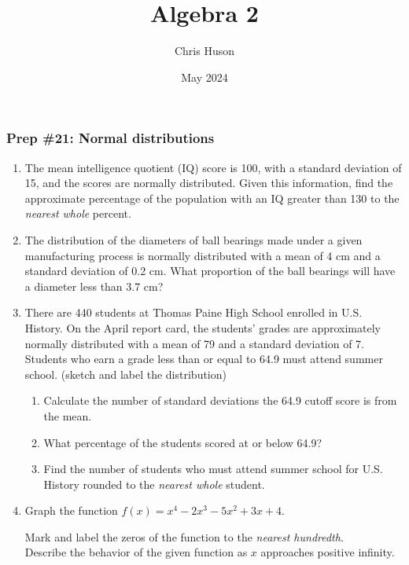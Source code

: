 \documentclass[12pt, twoside]{article}
\title{Algebra 2}
\author{Chris Huson}
\date{May 2024}
\begin{document}
\subsubsection*{Prep \#21: Normal distributions}
\begin{enumerate}[itemsep=0.5cm]
\item The mean intelligence quotient (IQ) score is 100, with a standard deviation of 15, and the scores are normally distributed. Given this information, find the approximate percentage of the population with an IQ greater than 130 to the \emph{nearest whole} percent. \vspace{3cm}

\item The distribution of the diameters of ball bearings made under a given manufacturing process is normally distributed with a mean of 4 cm and a standard deviation of 0.2 cm. What proportion of the ball bearings will have a diameter less than 3.7 cm?\vspace{4cm}

\item There are 440 students at Thomas Paine High School enrolled in U.S. History. On the April report card, the students' grades are approximately normally distributed with a mean of 79 and a standard deviation of 7. Students who earn a grade less than or equal to 64.9 must attend summer school. (sketch and label the distribution)  \begin{enumerate}
    \item Calculate the number of standard deviations the 64.9 cutoff score is from the mean. \vspace{1cm}
    \item What percentage of the students scored at or below 64.9? \vspace{2cm}
    \item Find the number of students who must attend summer school for U.S. History rounded to the \emph{nearest whole} student.
\end{enumerate} \vspace{2cm}


\newpage
\item Graph the function $f(x) = x^4-2x^{3}-5x^{2}+3x+4$. 
\begin{center}
    \end{center}
Mark and label the zeros of the function to the \emph{nearest hundredth}. \\[2cm]
Describe the behavior of the given function as $x$ approaches positive infinity.


\end{enumerate}
\end{document}
